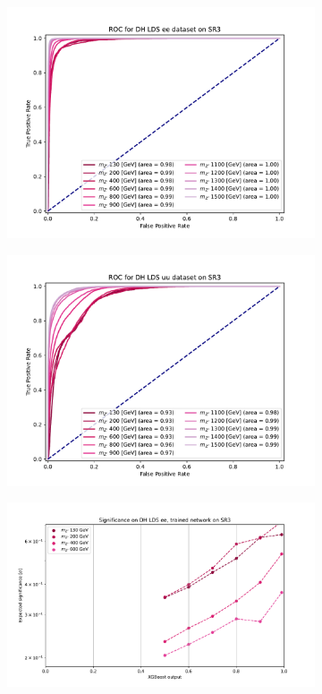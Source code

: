 \documentclass[12pt, a4paper]{book}
\begin{document}
\begin{figure}[!ht]
\begin{subfigure}[b]{0.49\textwidth}
      \includegraphics[width=1\textwidth]{XGBoost/Model_independent/150/DH_LDS/ROC_ee.pdf}
   \end{subfigure}
   \hfill
   \begin{subfigure}[b]{0.49\textwidth}
      \centering
      \includegraphics[width=1\textwidth]{XGBoost/Model_independent/150/DH_LDS/ROC_uu.pdf}
   \end{subfigure}
   \hfill
	\begin{subfigure}[b]{0.49\textwidth}
      \centering
      \includegraphics[width=1\textwidth]{XGBoost/Model_independent/150/DH_LDS/EXP_SIG_ee.pdf}

\end{subfigure}
\end{figure}
\end{document}
